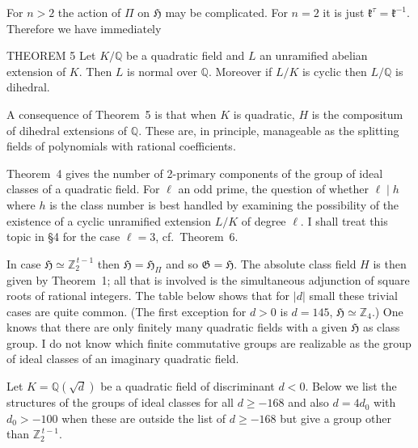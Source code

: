 \medskip

For $n>2$ the action of $\Pi$ on $\mathfrak{H}$ may be complicated. For
$n=2$ it is just $\mathfrak{k}^{\tau}=\mathfrak{k}^{-1}$. Therefore we
have immediately

\begin{namedstmt}{THEOREM 5}
Let $K/\mathbb{Q}$ be a quadratic field and $L$ an unramified abelian
extension of $K$. Then $L$ is normal over $\mathbb{Q}$. Moreover if
$L/K$ is cyclic then $L/\mathbb{Q}$ is dihedral.
\end{namedstmt}

A consequence of Theorem~5 is that when $K$ is quadratic, $H$ is the
compositum of dihedral extensions of $\mathbb{Q}$. These are, in
principle, manageable as the splitting fields of polynomials with rational
coefficients.

Theorem~4 gives the number of 2-primary components of the group of ideal
classes of a quadratic field. For $\ell$ an odd prime, the question of
whether $\ell\mid h$ where $h$ is the class number is best handled by
examining the possibility of the existence of a cyclic unramified
extension $L/K$ of degree $\ell$. I shall treat this topic in §4 for the
case $\ell=3$, cf.\ Theorem~6.

In case $\mathfrak{H}\simeq\mathbb{Z}_{2}^{\,t-1}$ then
$\mathfrak{H}=\mathfrak{H}_{\Pi}$ and so $\mathfrak{G}=\mathfrak{H}$. The
absolute class field $H$ is then given by Theorem~1; all that is involved
is the simultaneous adjunction of square roots of rational integers. The
table below shows that for $|d|$ small these trivial cases are quite
common. (The first exception for $d>0$ is $d=145$,
$\mathfrak{H}\simeq\mathbb{Z}_{4}$.) One knows that there are only
finitely many quadratic fields with a given $\mathfrak{H}$ as class
group. I do not know which finite commutative groups are realizable as
the group of ideal classes of an imaginary quadratic field.

Let $K=\mathbb{Q}(\sqrt{d})$ be a quadratic field of discriminant
$d<0$. Below we list the structures of the groups of ideal classes for
all $d\geq -168$ and also $d=4d_{0}$ with $d_{0}>-100$ when these are
outside the list of $d\geq -168$ but give a group other than
$\mathbb{Z}_{2}^{\,t-1}$.

